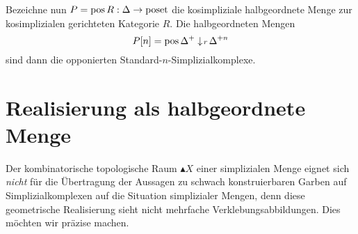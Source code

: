 Bezeichne nun $P = \operatorname{pos} R: \Delta \to \operatorname{poset}$ die kosimpliziale
halbgeordnete Menge zur kosimplizialen gerichteten Kategorie $R$. Die
halbgeordneten Mengen
\[ P[n] = \operatorname{pos} \Delta^+ \downarrow \! {\scriptstyle r} \, \Delta^{+n}
\]
sind dann die opponierten Standard-$n$-Simplizialkomplexe.

\section{Realisierung als halbgeordnete Menge}
\label{sec:real-poset}

Der kombinatorische topologische Raum $\blacktriangle X$ einer
simplizialen Menge eignet sich \emph{nicht} für die Übertragung der
Aussagen zu schwach konstruierbaren Garben auf Simplizialkomplexen auf
die Situation simplizialer Mengen, denn diese geometrische
Realisierung sieht nicht mehrfache Verklebungsabbildungen. Dies
möchten wir präzise machen.

